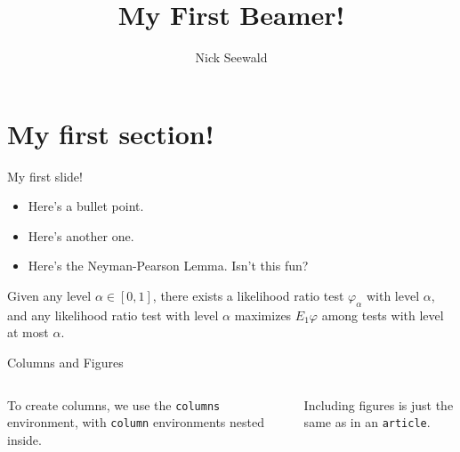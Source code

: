 \documentclass{beamer}
\title[An Alternate Title]{My First Beamer!}
\author{Nick Seewald}
\institute{University of Michigan}
\begin{document}
	\begin{frame}
		\titlepage
	\end{frame}
	
	\section{My first section!}
	\begin{frame}{My first slide!}	
		\begin{itemize}
			\item Here's a bullet point.
			\item Here's another one.
			\pause
			\item Here's the Neyman-Pearson Lemma. Isn't this fun?
		\end{itemize}
			\begin{theorem}
				Given any level $\alpha\in [0,1]$, there exists a likelihood ratio test $\varphi_{\alpha}$ with level $\alpha$, and any likelihood ratio test with level $\alpha$ maximizes $E_{1}\varphi$ among tests with level at most $\alpha$. 
			\end{theorem}
	\end{frame}
	
	\begin{frame}{Columns and Figures}
		\begin{columns}
			\begin{column}{.5\textwidth}
				To create columns, we use the \texttt{columns} environment, with \texttt{column} environments nested inside.
			\end{column}
			\begin{column}{.5\textwidth}
				Including figures is just the same as in an \texttt{article}.
			\end{column}
		\end{columns}
	\end{frame}
	
\end{document}
